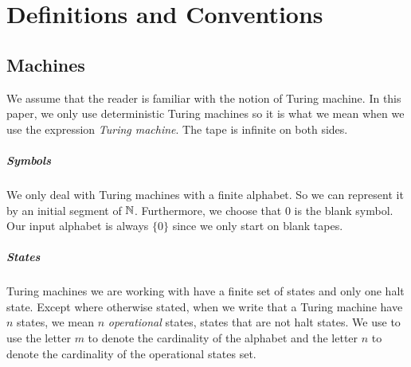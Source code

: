 \documentclass{report}
\begin{document}



\chapter{Definitions and Conventions}
\label{chap:pre}

\section{Machines}

We assume that the reader is familiar with the notion of Turing machine. In this paper, we only use deterministic Turing machines so it is what we mean when we use the expression \emph{Turing machine}. The tape is infinite on both sides.

\paragraph{Symbols}
We only deal with Turing machines with a finite alphabet. So we can represent it by an initial segment of $\mathbb{N}$. Furthermore, we choose that $0$ is the blank symbol. Our input alphabet is always $\{0\}$ since we only start on blank tapes. 

\paragraph{States}
Turing machines we are working with have a finite set of states and only one halt state.
 Except where otherwise stated, when we write that a Turing machine have $n$ states, we mean $n$ \emph{operational} states, \ie states that are not halt states. We use to use the letter $m$ to denote the cardinality of the alphabet and the letter $n$ to denote the cardinality of the operational states set.
\end{document}
